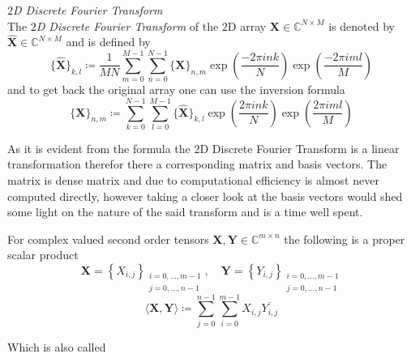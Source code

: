 \begin{Def}\label{def:2ddft}
    \emph{$2$D Discrete Fourier Transform}\\
    The \emph{$2$D Discrete Fourier Transform} of the $2$D array $\boldsymbol{X} \in \mathbb{C}^{N \times M}$ is denoted by 
    $\hat {\boldsymbol{X}} \in \mathbb{C}^{N \times M}$ and is defined by
    \begin{equation}\label{eq:2ddft}
        \{\hat {\boldsymbol{X}}\}_{k,l} \coloneq \frac{1}{MN}\sum_{m=0}^{M-1}\sum_{n=0}^{N-1} \{{\boldsymbol{X}}\}_{n,m}\exp\left({\frac{-2\pi ink}{N}}\right)\exp\left({\frac{-2\pi iml}{M}}\right)
    \end{equation}
    and to get back the original array one can use the inversion formula
    \begin{equation}\label{eq:2didft}
        \{{\boldsymbol{X}}\}_{n,m} \coloneq \sum_{k=0}^{N-1}\sum_{l=0}^{M-1}\{\hat {\boldsymbol{X}}\}_{k,l}\exp\left({\frac{2\pi ink}{N}}\right)\exp\left({\frac{2\pi iml}{M}}\right)
    \end{equation}    
\end{Def}

As it is evident from the formula the $2$D Discrete Fourier Transform is a linear transformation therefor 
there a corresponding matrix and basis vectors. The matrix is dense matrix and due to computational efficiency 
is almost never computed directly, however taking a closer look at the basis vectors would shed some light on 
the nature of the said transform and is a time well spent.



\begin{Prop}
    For complex valued second order tensors $\boldsymbol{X},\boldsymbol{Y} \in \mathbb{C}^{m \times n}$ the following is a proper scalar product
    \begin{equation*}
        \boldsymbol{X} = \left\{X_{i,j}\right\}_{\substack{i=0,\ldots,m-1\\ j=0,\ldots,n-1}}, \quad \boldsymbol{Y} = \left\{Y_{i,j}\right\}_{\substack{i=0,\ldots,m-1\\ j=0,\ldots,n-1}}
    \end{equation*}
    \begin{equation*}
        \langle\boldsymbol{X},\boldsymbol{Y}\rangle \coloneqq \sum_{j=0}^{n-1}\sum_{i=0}^{m-1} X_{i,j} \overline{Y_{i,j}} 
    \end{equation*}
\end{Prop}

Which is also called 

